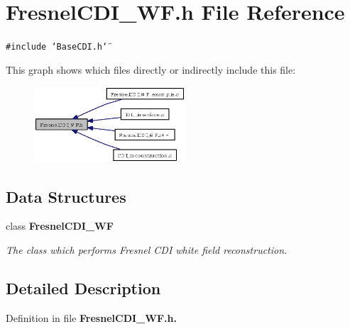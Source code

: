 \section{Fresnel\-CDI\_\-WF.h File Reference}
\label{FresnelCDI__WF_8h}
{\tt \#include \char`\"{}Base\-CDI.h\char`\"{}}\par


This graph shows which files directly or indirectly include this file:\begin{figure}[H]
\begin{center}
\leavevmode
\includegraphics[width=160pt]{FresnelCDI__WF_8h__dep__incl}
\end{center}
\end{figure}
\subsection*{Data Structures}
\begin{CompactItemize}
\item 
class \bf{Fresnel\-CDI\_\-WF}
\begin{CompactList}\small\item\em The class which performs Fresnel CDI white field reconstruction. \item\end{CompactList}\end{CompactItemize}


\subsection{Detailed Description}


Definition in file \bf{Fresnel\-CDI\_\-WF.h}.